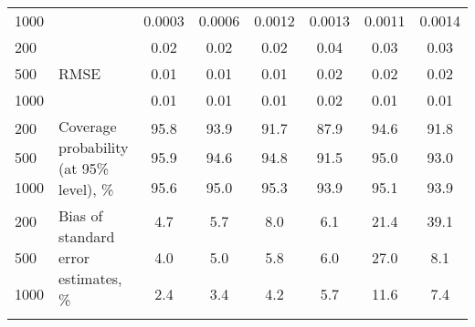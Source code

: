 \documentclass[letterpaper,fleqn,11pt]{article}
\begin{document}
\begin{table}[htbp]
\begin{tabular}{rrcccccc}
\multicolumn{1}{l}{1000} & \multicolumn{1}{l}{} & 0.0003 & 0.0006 & 0.0012 & 0.0013 & 0.0011 & 0.0014 \\
\multicolumn{1}{l}{200} & \multicolumn{1}{l}{\multirow{3}[2]{*}{RMSE}} & 0.02  & 0.02  & 0.02  & 0.04  & 0.03  & 0.03 \\
\multicolumn{1}{l}{500} & \multicolumn{1}{l}{} & 0.01  & 0.01  & 0.01  & 0.02  & 0.02  & 0.02 \\
\multicolumn{1}{l}{1000} & \multicolumn{1}{l}{} & 0.01  & 0.01  & 0.01  & 0.02  & 0.01  & 0.01 \\
\multicolumn{1}{l}{200} & \multicolumn{1}{l}{\multirow{3}[2]{4cm}{Coverage
probability (at 95\% level), \%}} & 95.8  & 93.9  & 91.7  & 87.9  & 94.6  & 91.8 \\
\multicolumn{1}{l}{500} & \multicolumn{1}{l}{}  & 95.9  & 94.6  & 94.8  & 91.5  & 95.0  & 93.0 \\
\multicolumn{1}{l}{1000} & \multicolumn{1}{l}{} & 95.6  & 95.0  & 95.3  & 93.9  & 95.1  & 93.9 \\
\multicolumn{1}{l}{200} & \multicolumn{1}{l}{\multirow{3}[2]{4cm}{Bias of
standard error estimates, \%}} & 4.7   & 5.7   & 8.0   & 6.1   & 21.4  & 39.1 \\
\multicolumn{1}{l}{500} & \multicolumn{1}{l}{} & 4.0   & 5.0   & 5.8   & 6.0   & 27.0  & 8.1 \\
\multicolumn{1}{l}{1000} & \multicolumn{1}{l}{} & 2.4   & 3.4   & 4.2   & 5.7   & 11.6  & 7.4 \\
\bottomrule \bottomrule &  &  &  &  &  &  & 
\end{tabular}%
\end{table}
\end{document}
